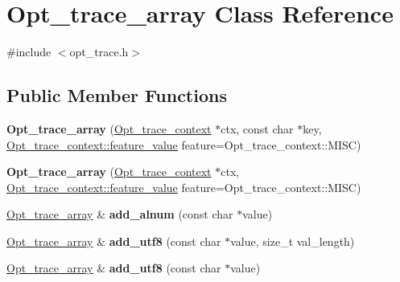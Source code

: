 \hypertarget{classOpt__trace__array}{}\section{Opt\+\_\+trace\+\_\+array Class Reference}
\label{classOpt__trace__array}


{\ttfamily \#include $<$opt\+\_\+trace.\+h$>$}

\subsection*{Public Member Functions}
\begin{DoxyCompactItemize}
\item 
\mbox{\label{classOpt__trace__array_a82331560125b901f8616415651aae365}} 
{\bfseries Opt\+\_\+trace\+\_\+array} (\mbox{\hyperlink{classOpt__trace__context}{Opt\+\_\+trace\+\_\+context}} $\ast$ctx, const char $\ast$key, \mbox{\hyperlink{classOpt__trace__context_a71428b27f932674f6b2535ee6c30845c}{Opt\+\_\+trace\+\_\+context\+::feature\+\_\+value}} feature=Opt\+\_\+trace\+\_\+context\+::\+M\+I\+SC)
\item 
\mbox{\label{classOpt__trace__array_aa00733c195b8983dcd7613c1dd709646}} 
{\bfseries Opt\+\_\+trace\+\_\+array} (\mbox{\hyperlink{classOpt__trace__context}{Opt\+\_\+trace\+\_\+context}} $\ast$ctx, \mbox{\hyperlink{classOpt__trace__context_a71428b27f932674f6b2535ee6c30845c}{Opt\+\_\+trace\+\_\+context\+::feature\+\_\+value}} feature=Opt\+\_\+trace\+\_\+context\+::\+M\+I\+SC)
\item 
\mbox{\label{classOpt__trace__array_a32b90edccbd688d6e054b4381e81fd41}} 
\mbox{\hyperlink{classOpt__trace__array}{Opt\+\_\+trace\+\_\+array}} \& {\bfseries add\+\_\+alnum} (const char $\ast$value)
\item 
\mbox{\label{classOpt__trace__array_a46c01df41aa8eaa80504d43d03ba7201}} 
\mbox{\hyperlink{classOpt__trace__array}{Opt\+\_\+trace\+\_\+array}} \& {\bfseries add\+\_\+utf8} (const char $\ast$value, size\+\_\+t val\+\_\+length)
\item 
\mbox{\label{classOpt__trace__array_a6b83c8c530eb0090c2f37e93f1e9354b}} 
\mbox{\hyperlink{classOpt__trace__array}{Opt\+\_\+trace\+\_\+array}} \& {\bfseries add\+\_\+utf8} (const char $\ast$value)

\end{DoxyCompactItemize}
